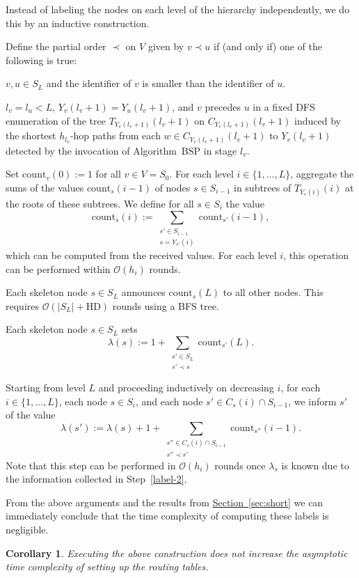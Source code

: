\documentclass[letterpaper,11pt]{article}
\newcommand{\namedref}[2]{\hyperref[#2]{#1~\ref*{#2}}}
\newcommand{\sectionref}[1]{\namedref{Section}{#1}}
\newtheorem{corollary}[theorem]{Corollary}
\newcommand{\BO}{\mathcal{O}}
\newcommand{\BSP}{\mathrm{BSP}\xspace}
\newcommand{\HD}{\mathrm{HD}}
\newcommand{\Lead}{Y}
\begin{document}
Instead of labeling the nodes on each level of the hierarchy independently, we
do this by an inductive construction.
\begin{compactenum}
\item Define the partial order $\prec$ on $V$ given by $v\prec u$ if (and only
if) one of the following is true:
\begin{compactitem}
\item $v,u\in S_L$ and the identifier of $v$ is smaller than the identifier of
$u$.
\item $l_v=l_u<L$, $\Lead_v(l_v+1)=\Lead_u(l_v+1)$, and $v$ precedes $u$ in a
fixed DFS enumeration of the tree $T_{\Lead_v(l_v+1)}(l_v+1)$ on
$C_{\Lead_v(l_v+1)}(l_v+1)$ induced by the shortest $h_{l_v}$-hop paths from
each $w\in C_{\Lead_v(l_v+1)}(l_v+1)$ to $\Lead_v(l_v+1)$ detected by the
invocation of Algorithm~$\BSP$ in stage $l_v$.
\end{compactitem}
\item \label{label-2} Set $\mathrm{count}_v(0):=1$ for all $v\in V=S_0$. For
each level $i\in \{1,\ldots,L\}$, aggregate the sums of the values
$\mathrm{count}_s(i-1)$ of nodes $s\in S_{i-1}$ in subtrees of
$T_{\Lead_s(i)}(i)$ at the roots of these subtrees. We define for all $s\in S_i$
the value
\begin{equation*}
\mathrm{count}_s(i):=\sum_{\substack{s'\in S_{i-1}\\
s=\Lead_{s'}(i)}}\mathrm{count}_{s'}(i-1),
\end{equation*}
which can be computed from the received values. For each level $i$, this
operation can be performed within $\BO(h_i)$ rounds.
\item Each skeleton node $s\in S_L$ announces $\mathrm{count}_s(L)$ to all
other nodes. This requires $\BO(|S_L|+\HD)$ rounds using a BFS tree.
\item Each skeleton node $s\in S_L$ sets 
\begin{equation*}
\lambda(s):=1+\sum_{\substack{s'\in S_L\\ s'\prec s}}\mathrm{count}_{s'}(L).
\end{equation*}
\item Starting from level $L$ and proceeding inductively on decreasing $i$, for
each $i\in \{1,\ldots,L\}$, each node $s\in S_i$, and each node $s'\in
C_s(i)\cap S_{i-1}$, we inform $s'$ of the value
\begin{equation*}
\lambda(s'):=\lambda(s)+1+\sum_{\substack{s''\in C_s(i)\cap S_{i-1}\\
s''\prec s'}}\mathrm{count}_{s''}(i-1).
\end{equation*}
Note that this step can be performed in $\BO(h_i)$ rounds once $\lambda_s$ is
known due to the information collected in Step~\ref{label-2}.
\end{compactenum}
From the above arguments and the results from \sectionref{sec:short} we can
immediately conclude that the time complexity of computing these labels is
negligible.
\begin{corollary}\label{coro:label_time}
Executing the above construction does not increase the asymptotic time
complexity of setting up the routing tables.
\end{corollary}
\end{document}
